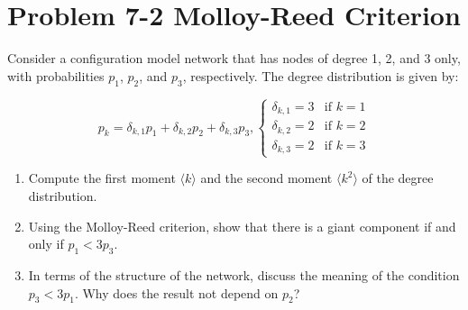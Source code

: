 \section{Problem 7-2 Molloy-Reed Criterion}

Consider a configuration model network that has nodes of degree 1, 2, and 3 only, with probabilities $p_1$, $p_2$, and $p_3$, respectively. The degree distribution is given by:

\begin{equation*}
	p_k = \delta_{k,1} p_1 + \delta_{k,2} p_2 + \delta_{k,3} p_3, 
	\begin{cases}
		\delta_{k,1} = 3 & \text{if $k = 1$} \\
		\delta_{k,2} = 2 & \text{if $k = 2$} \\
		\delta_{k,3} = 2 & \text{if $k = 3$}
	\end{cases}
\end{equation*}

\begin{enumerate}
	\item Compute the first moment $\langle k \rangle$ and the second moment $\langle k^2 \rangle$ of the degree distribution.
	
	\item Using the Molloy-Reed criterion, show that there is a giant component if and only if $p_1 < 3p_3$.
	
	\item In terms of the structure of the network, discuss the meaning of the condition $p_3 < 3p_1$. Why does the result not depend on $p_2$?
	
\end{enumerate}